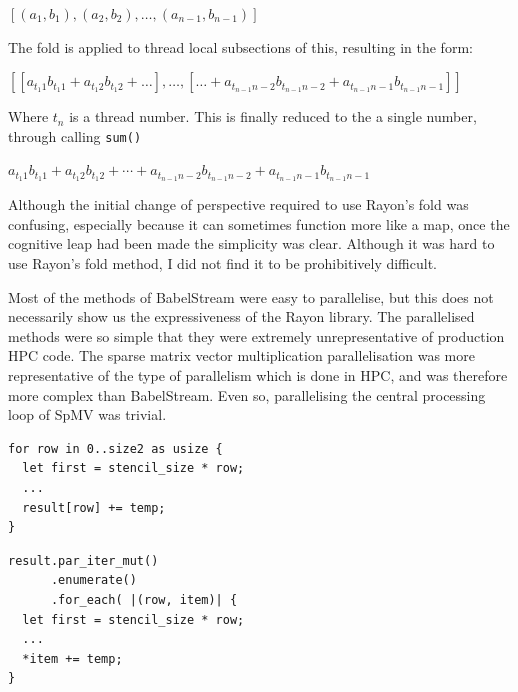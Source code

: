 \begin{center}
$[(a_1, b_1), (a_2, b_2), \ldots, (a_{n-1}, b_{n-1})]$
\end{center}

The fold is applied to thread local subsections of this, resulting in the form:

\begin{center}
$[ [a_{t_{1}1} b_{t_{1}1} + a_{t_{1}2}b_{t_{1}2} + \ldots ], \ldots ,[\ldots + a_{t_{n-1}{n-2}} b_{t_{n-1}{n-2}} + a_{t_{n-1}{n-1}} b_{t_{n-1}{n-1}}] ]$ 
\end{center}
Where $t_n$ is a thread number. This is finally reduced to the a single number, through calling \texttt{sum()}

\begin{center}
$a_{t_{1}1} b_{t_{1}1} + a_{t_{1}2}b_{t_{1}2} + \cdots + a_{t_{n-1}{n-2}} b_{t_{n-1}{n-2}} + a_{t_{n-1}{n-1}} b_{t_{n-1}{n-1}}$ 
\end{center}

Although the initial change of perspective required to use Rayon's fold was confusing, especially because it can sometimes function more like a map, once the cognitive leap had been made the simplicity was clear. Although it was hard to use Rayon's fold method, I did not find it to be prohibitively difficult.

Most of the methods of BabelStream were easy to parallelise, but this does not necessarily show us the expressiveness of the Rayon library. The parallelised methods were so simple that they were extremely unrepresentative of production HPC code. The sparse matrix vector multiplication parallelisation was more representative of the type of parallelism which is done in HPC, and was therefore more complex than BabelStream. Even so, parallelising the central processing loop of SpMV was trivial.
\noindent\begin{minipage}{.49\textwidth}
\begin{code}
\begin{verbatim}
for row in 0..size2 as usize {
  let first = stencil_size * row;
  ...
  result[row] += temp;
}
\end{verbatim}
\end{code}
\end{minipage}\hfill
\begin{minipage}{.49\textwidth}
\begin{code}
\begin{verbatim}
result.par_iter_mut()
      .enumerate()
      .for_each( |(row, item)| {
  let first = stencil_size * row;
  ...
  *item += temp;
}
\end{verbatim}
\label{lst:spmv-par}
\end{code}
\end{minipage}

